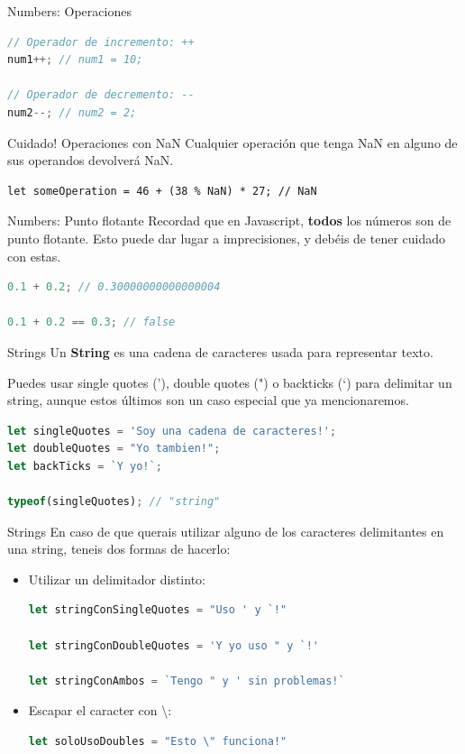 \documentclass{beamer}
\begin{document}
\begin{frame}[fragile]{Numbers: Operaciones}
\begin{lstlisting}[language=JavaScript]
// Operador de incremento: ++
num1++; // num1 = 10;

// Operador de decremento: --
num2--; // num2 = 2;
\end{lstlisting}

\begin{block}{Cuidado! Operaciones con NaN}
Cualquier operación que tenga NaN en alguno de sus operandos devolverá NaN. 
\begin{lstlisting}
let someOperation = 46 + (38 % NaN) * 27; // NaN
\end{lstlisting}
\end{block}
\end{frame}

\begin{frame}[fragile]{Numbers: Punto flotante}
Recordad que en Javascript, \textbf{todos} los números son de punto flotante. Esto puede dar lugar a imprecisiones, y debéis de tener cuidado con estas.

\begin{lstlisting}[language=JavaScript]
0.1 + 0.2; // 0.30000000000000004

0.1 + 0.2 == 0.3; // false
\end{lstlisting}
\end{frame}

\begin{frame}[fragile]{Strings}
Un \textbf{String} es una cadena de caracteres usada para representar texto.

Puedes usar single quotes ('), double quotes (") o backticks (`) para delimitar un string, aunque estos últimos son un caso especial que ya mencionaremos.

\begin{lstlisting}[language=JavaScript]
let singleQuotes = 'Soy una cadena de caracteres!';
let doubleQuotes = "Yo tambien!";
let backTicks = `Y yo!`;

typeof(singleQuotes); // "string"
\end{lstlisting}
\end{frame}

\begin{frame}[fragile]{Strings}
En caso de que querais utilizar alguno de los caracteres delimitantes en una string, teneis dos formas de hacerlo:
\begin{itemize}
\item Utilizar un delimitador distinto: 
\begin{lstlisting}[language=JavaScript]
let stringConSingleQuotes = "Uso ' y `!"

let stringConDoubleQuotes = 'Y yo uso " y `!'

let stringConAmbos = `Tengo " y ' sin problemas!`
\end{lstlisting}
\item Escapar el caracter con \textbackslash:
\begin{lstlisting}[language=JavaScript]
let soloUsoDoubles = "Esto \" funciona!"
\end{lstlisting}
\end{itemize}
\end{frame}
\end{document}
